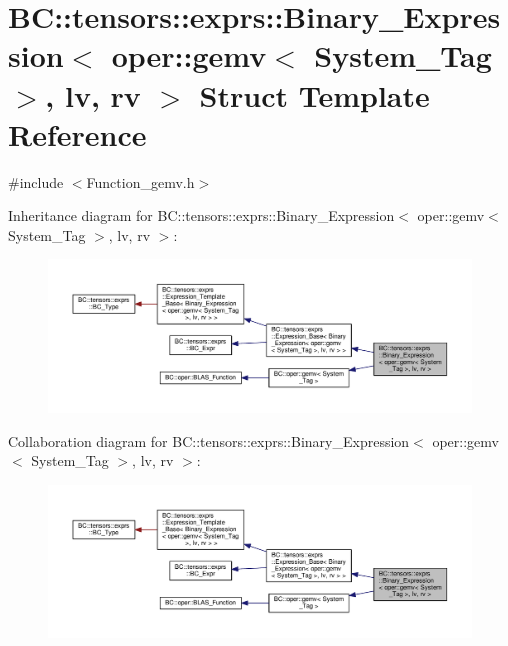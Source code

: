 \hypertarget{structBC_1_1tensors_1_1exprs_1_1Binary__Expression_3_01oper_1_1gemv_3_01System__Tag_01_4_00_01lv_00_01rv_01_4}{}\section{BC\+:\+:tensors\+:\+:exprs\+:\+:Binary\+\_\+\+Expression$<$ oper\+:\+:gemv$<$ System\+\_\+\+Tag $>$, lv, rv $>$ Struct Template Reference}
\label{structBC_1_1tensors_1_1exprs_1_1Binary__Expression_3_01oper_1_1gemv_3_01System__Tag_01_4_00_01lv_00_01rv_01_4}


{\ttfamily \#include $<$Function\+\_\+gemv.\+h$>$}



Inheritance diagram for BC\+:\+:tensors\+:\+:exprs\+:\+:Binary\+\_\+\+Expression$<$ oper\+:\+:gemv$<$ System\+\_\+\+Tag $>$, lv, rv $>$\+:
\nopagebreak
\begin{figure}[H]
\begin{center}
\leavevmode
\includegraphics[width=350pt]{structBC_1_1tensors_1_1exprs_1_1Binary__Expression_3_01oper_1_1gemv_3_01System__Tag_01_4_00_01lv_00_01rv_01_4__inherit__graph}
\end{center}
\end{figure}


Collaboration diagram for BC\+:\+:tensors\+:\+:exprs\+:\+:Binary\+\_\+\+Expression$<$ oper\+:\+:gemv$<$ System\+\_\+\+Tag $>$, lv, rv $>$\+:
\nopagebreak
\begin{figure}[H]
\begin{center}
\leavevmode
\includegraphics[width=350pt]{structBC_1_1tensors_1_1exprs_1_1Binary__Expression_3_01oper_1_1gemv_3_01System__Tag_01_4_00_01lv_00_01rv_01_4__coll__graph}
\end{center}
\end{figure}
